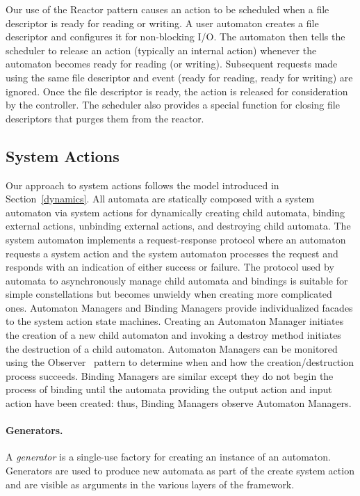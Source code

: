 Our use of the Reactor pattern causes an action to be scheduled when a file descriptor is ready for reading or writing.
A user automaton creates a file descriptor and configures it for non-blocking I/O.
The automaton then tells the scheduler to release an action (typically an internal action) whenever the automaton becomes ready for reading (or writing).
Subsequent requests made using the same file descriptor and event (ready for reading, ready for writing) are ignored.
Once the file descriptor is ready, the action is released for consideration by the controller.
The scheduler also provides a special function for closing file descriptors that purges them from the reactor.

\subsection{System Actions\label{system_action_section}}

Our approach to system actions follows the model introduced in Section~\ref{dynamics}.
All automata are statically composed with a system automaton via system actions for dynamically creating child automata, binding external actions, unbinding external actions, and destroying child automata.
The system automaton implements a request-response protocol where an automaton requests a system action and the system automaton processes the request and responds with an indication of either success or failure.
The protocol used by automata to asynchronously manage child automata and bindings is suitable for simple constellations but becomes unwieldy when creating more complicated ones.
Automaton Managers and Binding Managers provide individualized facades to the system action state machines.
Creating an Automaton Manager initiates the creation of a new child automaton and invoking a destroy method initiates the destruction of a child automaton.
Automaton Managers can be monitored using the Observer~\cite{gamma1995design} pattern to determine when and how the creation/destruction process succeeds.
Binding Managers are similar except they do not begin the process of binding until the automata providing the output action and input action have been created: thus, Binding Managers observe Automaton Managers.

\ifjournal
\paragraph*{Generators.}
A \emph{generator} is a single-use factory for creating an instance of an automaton.
Generators are used to produce new automata as part of the create system action and are visible as arguments in the various layers of the framework.
\fi
